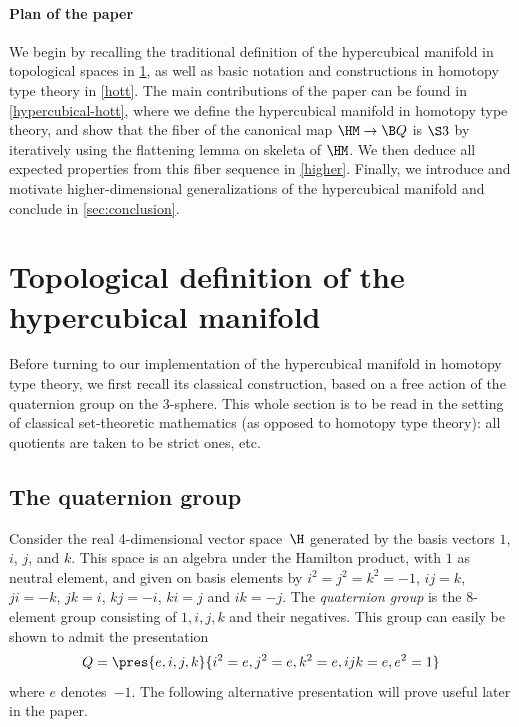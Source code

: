 \documentclass[a4paper]{article}
\begin{document}
\paragraph{Plan of the paper}
We begin by recalling the traditional definition of the hypercubical manifold in topological spaces in \cref{topological-definition}, as well as basic notation and constructions in homotopy type theory in \cref{hott}. The main contributions of the paper can be found in \cref{hypercubical-hott}, where we define the hypercubical manifold in homotopy type theory, and show that the fiber of the canonical map $\HM\to\B Q$ is $\S3$ by iteratively using the flattening lemma on skeleta of $\HM$. We then deduce all expected properties from this fiber sequence in \cref{higher}. Finally, we introduce and motivate higher-dimensional generalizations of the hypercubical manifold and conclude in \cref{sec:conclusion}.

\section{Topological definition of the hypercubical manifold}
\label{topological-definition}
Before turning to our implementation of the hypercubical manifold in homotopy type theory, we first recall its classical construction, based on a free action of the quaternion group on the 3-sphere. This whole section is to be read in the setting of classical set-theoretic mathematics (as opposed to homotopy type theory): all quotients are taken to be strict ones, etc.

\subsection{The quaternion group}
Consider the real 4-dimensional vector space~$\H$ generated by the basis vectors $1$, $i$, $j$, and $k$. This space is an algebra under the Hamilton product, with $1$ as neutral element, and given on basis elements by $i^2=j^2=k^2=-1$, $ij=k$, $ji=-k$, $jk=i$, $kj=-i$, $ki=j$ and $ik=-j$. The \emph{quaternion group} is the 8-element group consisting of $1,i,j,k$ and their negatives. This group can easily be shown to admit the presentation
\begin{equation}
  \label{q-std-pres}
  Q=\pres{e,i,j,k}{i^2=e,j^2=e,k^2=e,ijk=e,e^2=1}
\end{equation}
where $e$ denotes~$-1$. The following alternative presentation will prove useful later in the paper.
\end{document}
